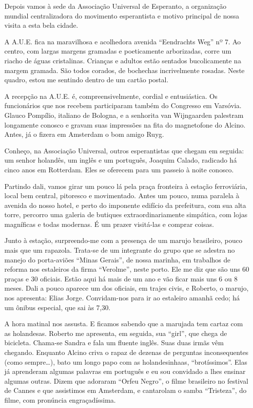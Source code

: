 Depois vamos à sede da Associação Universal de Esperanto, a organização mundial centralizadora do movimento esperantista e motivo principal de nossa visita a esta bela cidade.

A A.U.E. fica na maravilhosa e acolhedora avenida ``Eendrachts Weg'' nº 7. Ao centro, com largas margens gramadas e poeticamente arborizadas, corre um riacho de águas cristalinas. Crianças e adultos estão sentados bucolicamente na margem gramada. São todos corados, de bochechas incrivelmente rosadas. Neste quadro, estou me sentindo dentro de um cartão postal.

A recepção na A.U.E. é, compreensivelmente, cordial e entusiástica. Os funcionários que nos recebem participaram também do Congresso em Varsóvia. Glauco Pompílio, italiano de Bologna, e a senhorita van Wijngaarden palestram longamente conosco e gravam suas impressões na fita do magnetofone do Alcino. Antes, já o fizera em Amsterdam o bom amigo Ruyg.

Conheço, na Associação Universal, outros esperantistas que chegam em seguida: um senhor holandês, um inglês e um português, Joaquim Calado, radicado há cinco anos em Rotterdam. Eles se oferecem para um passeio à noite conosco.

Partindo dali, vamos girar um pouco lá pela praça fronteira à estação ferroviária, local bem central, pitoresco e movimentado. Antes um pouco, numa paralela à avenida do nosso hotel, e perto do imponente edifício da prefeitura, com sua alta torre, percorro uma galeria de butiques extraordinariamente simpática, com lojas magníficas e todas modernas. É um prazer visitá-las e comprar coisas.

Junto à estação, surpreendo-me com a presença de um marujo brasileiro, pouco mais que um rapazola. Trata-se de um integrante do grupo que se adestra no manejo do porta-aviões ``Minas Gerais'', de nossa marinha, em trabalhos de reforma nos estaleiros da firma ``Verolme'', neste porto. Ele me diz que são uns 60 praças e 30 oficiais. Estão aqui há mais de um ano e vão ficar mais uns 6 ou 8 meses. Dali a pouco aparece um dos oficiais, em trajes civis, e Roberto, o marujo, nos apresenta: Elias Jorge. Convidam-nos para ir ao estaleiro amanhã cedo; há um ônibus especial, que sai às 7,30.

A hora matinal nos assusta. E ficamos sabendo que a marujada tem cartaz com as holandesas. Roberto me apresenta, em seguida, sua ``girl'', que chega de bicicleta. Chama-se Sandra e fala um fluente inglês. Suas duas irmãs vêm chegando. Enquanto Alcino criva o rapaz de dezenas de perguntas inconsequentes (como sempre\ldots), bato um longo papo com as holandesinhaas, ``brotíssimos''. Elas já aprenderam algumas palavras em português e eu sou convidado a lhes ensinar algumas outras. Dizem que adoraram ``Orfeu Negro'', o filme brasileiro no festival de Cannes e que assistimos em Amsterdam, e cantarolam o samba ``Tristeza'', do filme, com pronúncia engraçadíssima.

